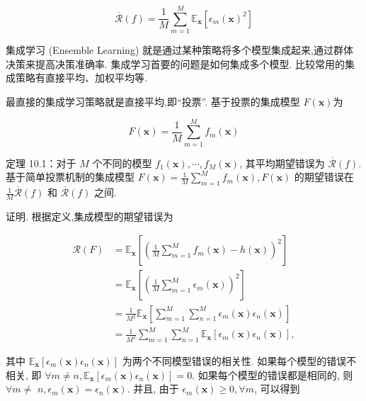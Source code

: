 \documentclass[10pt]{article}
\begin{document}
\begin{equation*}
\overline{\mathcal{R}}(f)=\frac{1}{M} \sum_{m=1}^{M} \mathbb{E}_{\boldsymbol{x}}\left[\epsilon_{m}(\boldsymbol{x})^{2}\right] \tag{10.3}
\end{equation*}


集成学习 (Ensemble Learning) 就是通过某种策略将多个模型集成起来,通过群体决策来提高决策准确率. 集成学习首要的问题是如何集成多个模型. 比较常用的集成策略有直接平均、加权平均等.

最直接的集成学习策略就是直接平均,即“投票”. 基于投票的集成模型 $F(\boldsymbol{x})$为


\begin{equation*}
F(\boldsymbol{x})=\frac{1}{M} \sum_{m=1}^{M} f_{m}(\boldsymbol{x}) \tag{10.4}
\end{equation*}


定理 10.1：对于 $M$ 个不同的模型 $f_{1}(\boldsymbol{x}), \cdots, f_{M}(\boldsymbol{x})$, 其平均期望错误为 $\overline{\mathcal{R}}(f)$. 基于简单投票机制的集成模型 $F(\boldsymbol{x})=\frac{1}{M} \sum_{m=1}^{M} f_{m}(\boldsymbol{x}), F(\boldsymbol{x})$ 的期望错误在 $\frac{1}{M} \overline{\mathcal{R}}(f)$ 和 $\overline{\mathcal{R}}(f)$ 之间.

证明. 根据定义,集成模型的期望错误为


\begin{align*}
\mathcal{R}(F) & =\mathbb{E}_{\boldsymbol{x}}\left[\left(\frac{1}{M} \sum_{m=1}^{M} f_{m}(\boldsymbol{x})-h(\boldsymbol{x})\right)^{2}\right]  \tag{10.5}\\
& =\mathbb{E}_{\boldsymbol{x}}\left[\left(\frac{1}{M} \sum_{m=1}^{M} \epsilon_{m}(\boldsymbol{x})\right)^{2}\right]  \tag{10.6}\\
& =\frac{1}{M^{2}} \mathbb{E}_{\boldsymbol{x}}\left[\sum_{m=1}^{M} \sum_{n=1}^{M} \epsilon_{m}(\boldsymbol{x}) \epsilon_{n}(\boldsymbol{x})\right]  \tag{10.7}\\
& =\frac{1}{M^{2}} \sum_{m=1}^{M} \sum_{n=1}^{M} \mathbb{E}_{\boldsymbol{x}}\left[\epsilon_{m}(\boldsymbol{x}) \epsilon_{n}(\boldsymbol{x})\right], \tag{10.8}
\end{align*}


其中 $\mathbb{E}_{\boldsymbol{x}}\left[\epsilon_{m}(\boldsymbol{x}) \epsilon_{n}(\boldsymbol{x})\right]$ 为两个不同模型错误的相关性. 如果每个模型的错误不相关, 即 $\forall m \neq n, \mathbb{E}_{\boldsymbol{x}}\left[\epsilon_{m}(\boldsymbol{x}) \epsilon_{n}(\boldsymbol{x})\right]=0$. 如果每个模型的错误都是相同的, 则 $\forall m \neq$ $n, \epsilon_{m}(\boldsymbol{x})=\epsilon_{n}(\boldsymbol{x})$. 并且, 由于 $\epsilon_{m}(\boldsymbol{x}) \geq 0, \forall m$, 可以得到
\end{document}
